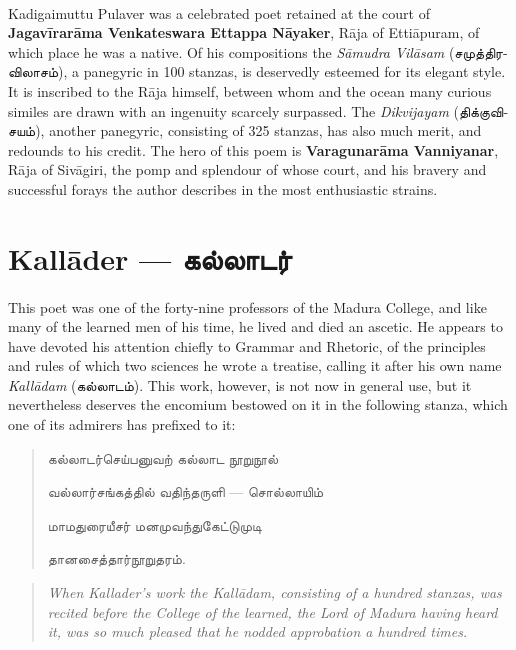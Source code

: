 \documentclass{article}
\newcommand{\TamilText}[1]{\texttamil{#1}}
\newcommand{\TamilBold}[1]{\texttamil{\textbf{#1}}}
\newcommand{\tam}[1]{\TamilText{#1}}
\newcommand{\tambold}[1]{\TamilBold{#1}}
\begin{document}
\paragraph{}
Kadigaimuttu Pulaver was a celebrated poet retained at the court of \textbf{Jagav\={i}rar\={a}ma Venkateswara Ettappa N\={a}yaker}, R\={a}ja of Etti\={a}puram, of which place he was a native. Of his compositions the \emph{S\={a}mudra Vil\={a}sam} (\tam{சமுத்திரவிலாசம்}), a panegyric in 100 stanzas, is deservedly esteemed for its elegant style. It is inscribed to the R\={a}ja himself, between whom and the ocean many curious similes are drawn with an ingenuity scarcely surpassed. The \emph{Dikvijayam} (\tam{திக்குவிசயம்}), another panegyric, consisting of 325 stanzas, has also much merit, and redounds to his credit. The hero of this poem is \textbf{Varagunar\={a}ma Vanniyanar}, R\={a}ja of Siv\={a}giri, the pomp and splendour of whose court, and his bravery and successful forays the author describes in the most enthusiastic strains.

\section{Kall\={a}der --- \tambold{கல்லாடர்}}
\paragraph{}
This poet was one of the forty-nine professors of the Madura College, and like many of the learned men of his time, he lived and died an ascetic. He appears to have devoted his attention chiefly to Grammar and Rhetoric, of the principles and rules of which two sciences he wrote a treatise, calling it after his own name \emph{Kall\={a}dam} (\tam{கல்லாடம்}). This work, however, is not now in general use, but it nevertheless deserves the encomium bestowed on it in the following stanza, which one of its admirers has prefixed to it:
\begin{quotation}\small
\tam{கல்லாடர்செய்பனுவற்‌ கல்லாட நூறுநூல்‌}

\tam{வல்லார்சங்கத்தில்‌ வதிந்தருளி} --- \tam{சொல்லாயிம்‌}

\tam{மாமதுரையீசர்‌ மனமுவந்துகேட்டுமுடி}

\tam{தானசைத்தார்நூறுதரம்}.
\end{quotation}
\begin{quotation}\small
\emph{When Kallader's work the Kall\={a}dam, consisting of a hundred stanzas, was recited before the College of the learned, the Lord of Madura having heard it, was so much pleased that he nodded approbation a hundred times.}
\end{quotation}
\end{document}
